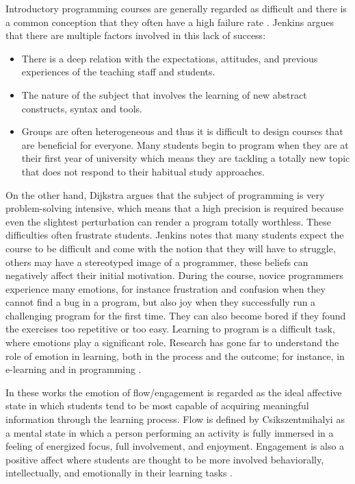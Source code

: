 \documentclass[a4paper]{llncs}
\begin{document}
Introductory programming courses are
generally regarded as difficult \cite{robins2003learning,lahtinen2005study} 
and there is a common conception that they often have a high
failure rate \cite{bennedsen2007failure}. Jenkins \cite{jenkins2001motivation} argues that there 
are multiple factors involved in this lack of success: 
\begin{itemize}
\item There is a deep relation with the expectations, attitudes, 
and previous experiences of the teaching staff and students. 
\item The nature of the subject that involves the 
learning of new abstract constructs, syntax and tools.
\item Groups are often heterogeneous and thus it is difficult to design courses 
that are beneficial for everyone. Many students begin to program when they 
are at their first year of university which means they are tackling a totally
new topic that does not respond to their habitual study approaches. 
\end{itemize}
On the other hand, Dijkstra \cite{dijkstra1989cruelty} argues that the subject of programming is very
problem-solving intensive, which means that a  high precision is required because even the
slightest perturbation can render a program totally worthless. These
difficulties often frustrate students. 
Jenkins \cite{jenkins2001motivation,jenkins2002difficulty} notes that many
students expect the course to be difficult and come with the notion that they
will have to struggle, others may have a stereotyped image of a programmer,
these beliefs can negatively affect their initial motivation. During the course,
novice programmers experience many emotions, for instance frustration and
confusion when they cannot find a bug in a program, but also joy when they
successfully run a challenging program for the first time. They can also become
bored if they found the exercises too repetitive or too easy. Learning to
program is a difficult task, where emotions play a significant role. Research
has gone far to understand the role of emotion in learning, both in the process
and the outcome; for instance, in e-learning  \cite{kort2001affective,rossin2009effects}
and in programming  \cite{rodrigo2009affective,jenkins2001motivation,
bosch2013emotions,khan2007mood}.

In these works the emotion of flow/engagement is regarded as the ideal affective state in which
students tend to be most capable of acquiring meaningful information through the
learning process. Flow is defined by Csikszentmihalyi \cite{csikszentmihalyi1990flow}
as a mental state in which a person performing an activity is fully immersed in a feeling of
energized focus, full involvement, and enjoyment. Engagement is also a positive
affect where students are thought to be more involved behaviorally,
intellectually, and emotionally in their learning tasks \cite{bangert2002teacher}.
\end{document}
